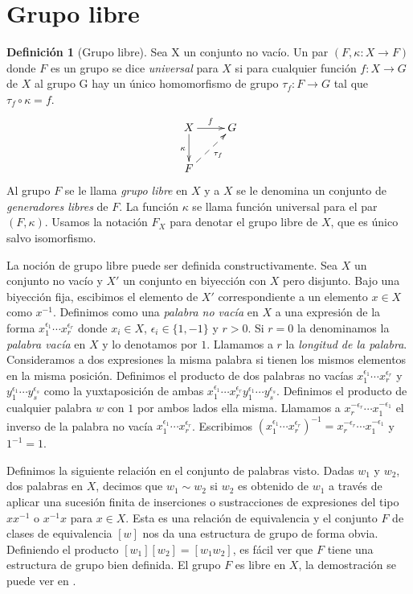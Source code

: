\documentclass[12pt]{book}
\theoremstyle{definition}
\newtheorem{defi}{Definición}[section]
\begin{document}
\section{Grupo libre}
\label{sec:grupo_libre}
\begin{defi}[Grupo libre]
Sea X un conjunto no vacío. Un par $(F,\kappa:X\rightarrow F)$ donde $F$ es un grupo se dice \textit{universal} para $X$ si para cualquier función $f:X\rightarrow G$ de $X$ al grupo G hay un único homomorfismo de grupo $\tau_f:F\rightarrow G$ tal que $\tau_f\circ\kappa = f.$
$$
\xymatrix{
X \ar[d]_\kappa\ar[r]^f & G \\
F \ar@{-->}_{\tau_f}[ur] &
}
$$
Al grupo $F$ se le llama \textit{grupo libre} en $X$ y a $X$ se le denomina un conjunto de \textit{generadores libres} de $F$. La función $\kappa$ se llama función universal para el par $(F,\kappa)$. Usamos la notación $F_X$ para denotar el grupo libre de $X$, que es único salvo isomorfismo.



La noción de grupo libre puede ser definida constructivamente. Sea $X$ un conjunto no vacío y $X'$ un conjunto en biyección con $X$ pero disjunto. Bajo una biyección fija, escibimos el elemento de $X'$ correspondiente a un elemento $x\in X$ como $x^{-1}$. Definimos como una \textit{palabra no vacía} en $X$ a una expresión de la forma $x_1^{\epsilon_1}\cdots x_r^{\epsilon_r}$ donde $x_i\in X$, $\epsilon_i\in\{1,-1\}$ y $r>0$. Si $r = 0$ la denominamos la \textit{palabra vacía} en $X$ y lo denotamos por $1$. Llamamos a $r$ la \textit{longitud de la palabra}. Consideramos a dos expresiones la misma palabra si tienen los mismos elementos en la misma posición. Definimos el producto de dos palabras no vacías $x_1^{\epsilon_1}\cdots x_r^{\epsilon_r}$ y $y_1^{\epsilon_1}\cdots y_s^{\epsilon_s}$ como la yuxtaposición de ambas $x_1^{\epsilon_1}\cdots x_r^{\epsilon_r}y_1^{\epsilon_1}\cdots y_s^{\epsilon_s}$. Definimos el producto de cualquier palabra $w$ con $1$ por ambos lados ella misma. Llamamos a $x_r^{-\epsilon_r}\cdots x_1^{-\epsilon_1}$ el inverso de la palabra no vacía $x_1^{\epsilon_1}\cdots x_r^{\epsilon_r}$. Escribimos $(x_1^{\epsilon_1}\cdots x_r^{\epsilon_r})^{-1}=x_r^{-\epsilon_r}\cdots x_1^{-\epsilon_1}$ y $1^{-1}=1$. 

Definimos la siguiente relación en el conjunto de palabras visto. Dadas $w_1$ y $w_2$, dos palabras en $X$, decimos que $w_1\sim w_2$ si $w_2$ es obtenido de $w_1$ a través de aplicar una sucesión finita de inserciones o sustracciones de expresiones del tipo $xx^{-1}$ o $x^{-1}x$ para $x\in X$. Esta es una relación de equivalencia y el conjunto $F$ de clases de equivalencia $[w]$ nos da una estructura de grupo de forma obvia. Definiendo el producto $[w_1][w_2]=[w_1w_2]$, es fácil ver que $F$ tiene una estructura de grupo bien definida. El grupo $F$ es libre en $X$, la demostración se puede ver en \cite{free}.


\end{defi}
\end{document}
